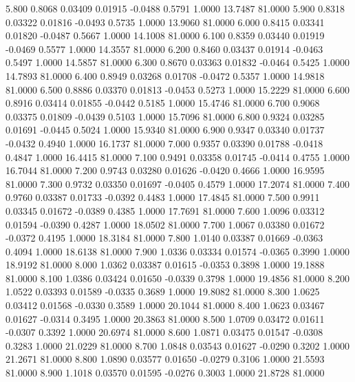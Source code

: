    5.800   0.8068   0.03409   0.01915  -0.0488   0.5791   1.0000  13.7487  81.0000
   5.900   0.8318   0.03322   0.01816  -0.0493   0.5735   1.0000  13.9060  81.0000
   6.000   0.8415   0.03341   0.01820  -0.0487   0.5667   1.0000  14.1008  81.0000
   6.100   0.8359   0.03440   0.01919  -0.0469   0.5577   1.0000  14.3557  81.0000
   6.200   0.8460   0.03437   0.01914  -0.0463   0.5497   1.0000  14.5857  81.0000
   6.300   0.8670   0.03363   0.01832  -0.0464   0.5425   1.0000  14.7893  81.0000
   6.400   0.8949   0.03268   0.01708  -0.0472   0.5357   1.0000  14.9818  81.0000
   6.500   0.8886   0.03370   0.01813  -0.0453   0.5273   1.0000  15.2229  81.0000
   6.600   0.8916   0.03414   0.01855  -0.0442   0.5185   1.0000  15.4746  81.0000
   6.700   0.9068   0.03375   0.01809  -0.0439   0.5103   1.0000  15.7096  81.0000
   6.800   0.9324   0.03285   0.01691  -0.0445   0.5024   1.0000  15.9340  81.0000
   6.900   0.9347   0.03340   0.01737  -0.0432   0.4940   1.0000  16.1737  81.0000
   7.000   0.9357   0.03390   0.01788  -0.0418   0.4847   1.0000  16.4415  81.0000
   7.100   0.9491   0.03358   0.01745  -0.0414   0.4755   1.0000  16.7044  81.0000
   7.200   0.9743   0.03280   0.01626  -0.0420   0.4666   1.0000  16.9595  81.0000
   7.300   0.9732   0.03350   0.01697  -0.0405   0.4579   1.0000  17.2074  81.0000
   7.400   0.9760   0.03387   0.01733  -0.0392   0.4483   1.0000  17.4845  81.0000
   7.500   0.9911   0.03345   0.01672  -0.0389   0.4385   1.0000  17.7691  81.0000
   7.600   1.0096   0.03312   0.01594  -0.0390   0.4287   1.0000  18.0502  81.0000
   7.700   1.0067   0.03380   0.01672  -0.0372   0.4195   1.0000  18.3184  81.0000
   7.800   1.0140   0.03387   0.01669  -0.0363   0.4094   1.0000  18.6138  81.0000
   7.900   1.0336   0.03334   0.01574  -0.0365   0.3990   1.0000  18.9192  81.0000
   8.000   1.0362   0.03387   0.01615  -0.0353   0.3898   1.0000  19.1888  81.0000
   8.100   1.0386   0.03424   0.01650  -0.0339   0.3798   1.0000  19.4856  81.0000
   8.200   1.0522   0.03393   0.01589  -0.0335   0.3689   1.0000  19.8082  81.0000
   8.300   1.0625   0.03412   0.01568  -0.0330   0.3589   1.0000  20.1044  81.0000
   8.400   1.0623   0.03467   0.01627  -0.0314   0.3495   1.0000  20.3863  81.0000
   8.500   1.0709   0.03472   0.01611  -0.0307   0.3392   1.0000  20.6974  81.0000
   8.600   1.0871   0.03475   0.01547  -0.0308   0.3283   1.0000  21.0229  81.0000
   8.700   1.0848   0.03543   0.01627  -0.0290   0.3202   1.0000  21.2671  81.0000
   8.800   1.0890   0.03577   0.01650  -0.0279   0.3106   1.0000  21.5593  81.0000
   8.900   1.1018   0.03570   0.01595  -0.0276   0.3003   1.0000  21.8728  81.0000
